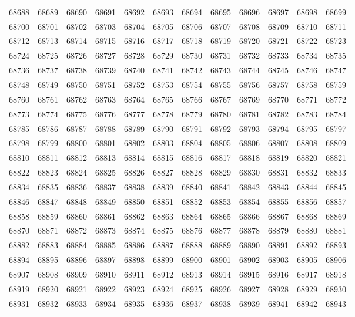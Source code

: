 \begin{center}
\begin{longtable}{llllllllllll}
68688 &68689 &68690 &68691 &68692 &68693 &68694 &68695 &68696 &68697 &68698 &68699 \\
68700 &68701 &68702 &68703 &68704 &68705 &68706 &68707 &68708 &68709 &68710 &68711 \\
68712 &68713 &68714 &68715 &68716 &68717 &68718 &68719 &68720 &68721 &68722 &68723 \\
68724 &68725 &68726 &68727 &68728 &68729 &68730 &68731 &68732 &68733 &68734 &68735 \\
68736 &68737 &68738 &68739 &68740 &68741 &68742 &68743 &68744 &68745 &68746 &68747 \\
68748 &68749 &68750 &68751 &68752 &68753 &68754 &68755 &68756 &68757 &68758 &68759 \\
68760 &68761 &68762 &68763 &68764 &68765 &68766 &68767 &68769 &68770 &68771 &68772 \\
68773 &68774 &68775 &68776 &68777 &68778 &68779 &68780 &68781 &68782 &68783 &68784 \\
68785 &68786 &68787 &68788 &68789 &68790 &68791 &68792 &68793 &68794 &68795 &68797 \\
68798 &68799 &68800 &68801 &68802 &68803 &68804 &68805 &68806 &68807 &68808 &68809 \\
68810 &68811 &68812 &68813 &68814 &68815 &68816 &68817 &68818 &68819 &68820 &68821 \\
68822 &68823 &68824 &68825 &68826 &68827 &68828 &68829 &68830 &68831 &68832 &68833 \\
68834 &68835 &68836 &68837 &68838 &68839 &68840 &68841 &68842 &68843 &68844 &68845 \\
68846 &68847 &68848 &68849 &68850 &68851 &68852 &68853 &68854 &68855 &68856 &68857 \\
68858 &68859 &68860 &68861 &68862 &68863 &68864 &68865 &68866 &68867 &68868 &68869 \\
68870 &68871 &68872 &68873 &68874 &68875 &68876 &68877 &68878 &68879 &68880 &68881 \\
68882 &68883 &68884 &68885 &68886 &68887 &68888 &68889 &68890 &68891 &68892 &68893 \\
68894 &68895 &68896 &68897 &68898 &68899 &68900 &68901 &68902 &68903 &68905 &68906 \\
68907 &68908 &68909 &68910 &68911 &68912 &68913 &68914 &68915 &68916 &68917 &68918 \\
68919 &68920 &68921 &68922 &68923 &68924 &68925 &68926 &68927 &68928 &68929 &68930 \\
68931 &68932 &68933 &68934 &68935 &68936 &68937 &68938 &68939 &68941 &68942 &68943 \\

\end{longtable}
\end{center}
